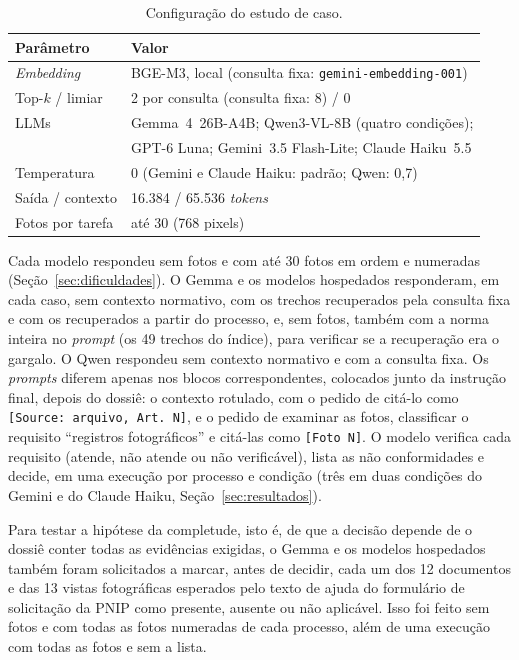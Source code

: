 \begin{table}[htb]
	\centering
	\caption{Configuração do estudo de caso.}
	\label{tab:parametros}
	\small
	\begin{tabular}{|l|l|}
		\hline
		\textbf{Parâmetro} & \textbf{Valor} \\
		\hline
		\textit{Embedding} & BGE-M3, local (consulta fixa: \texttt{gemini-embedding-001}) \\
		Top-$k$ / limiar & 2 por consulta (consulta fixa: 8) / 0 \\
		LLMs & Gemma~4~26B-A4B; Qwen3-VL-8B (quatro condições); \\
		 & GPT-6 Luna; Gemini~3.5 Flash-Lite; Claude Haiku~5.5 \\
		Temperatura & 0 (Gemini e Claude Haiku: padrão; Qwen: 0,7) \\
		Saída / contexto & 16.384 / 65.536 \textit{tokens} \\
		Fotos por tarefa & até 30 (768 pixels) \\
		\hline
	\end{tabular}
\end{table}

Cada modelo respondeu sem fotos e com até 30 fotos em ordem e numeradas (Seção~\ref{sec:dificuldades}). O Gemma e os modelos hospedados responderam, em cada caso, sem contexto normativo, com os trechos recuperados pela consulta fixa e com os recuperados a partir do processo, e, sem fotos, também com a norma inteira no \textit{prompt} (os 49 trechos do índice), para verificar se a recuperação era o gargalo. O Qwen respondeu sem contexto normativo e com a consulta fixa. Os \textit{prompts} diferem apenas nos blocos correspondentes, colocados junto da instrução final, depois do dossiê: o contexto rotulado, com o pedido de citá-lo como \texttt{[Source: arquivo, Art.~N]}, e o pedido de examinar as fotos, classificar o requisito ``registros fotográficos'' e citá-las como \texttt{[Foto~N]}. O modelo verifica cada requisito (atende, não atende ou não verificável), lista as não conformidades e decide, em uma execução por processo e condição (três em duas condições do Gemini e do Claude Haiku, Seção~\ref{sec:resultados}).

Para testar a hipótese da completude, isto é, de que a decisão depende de o dossiê conter todas as evidências exigidas, o Gemma e os modelos hospedados também foram solicitados a marcar, antes de decidir, cada um dos 12 documentos e das 13 vistas fotográficas esperados pelo texto de ajuda do formulário de solicitação da PNIP como presente, ausente ou não aplicável. Isso foi feito sem fotos e com todas as fotos numeradas de cada processo, além de uma execução com todas as fotos e sem a lista.

